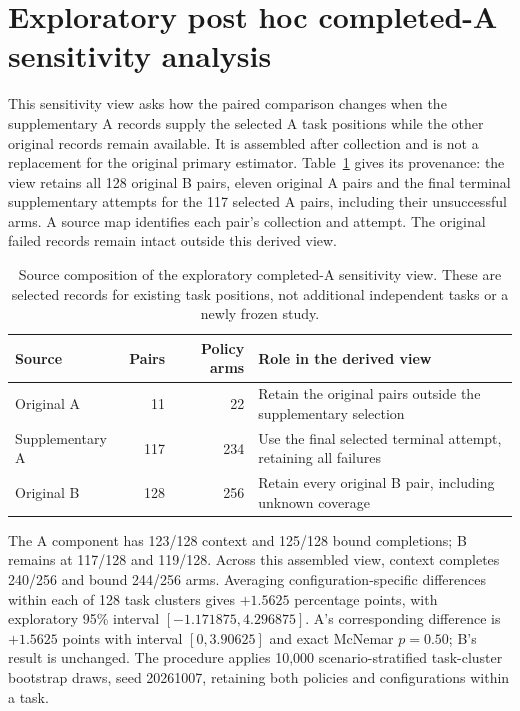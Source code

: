 \documentclass[11pt,a4paper]{article}
\begin{document}
\section{Exploratory post hoc completed-A sensitivity analysis}
\label{app:completed-a-sensitivity}
This sensitivity view asks how the paired comparison changes when the supplementary A records supply the selected A task positions while the other original records remain available. It is assembled after collection and is not a replacement for the original primary estimator. Table~\ref{tab:sensitivity-sources} gives its provenance: the view retains all 128 original B pairs, eleven original A pairs and the final terminal supplementary attempts for the 117 selected A pairs, including their unsuccessful arms. A source map identifies each pair's collection and attempt. The original failed records remain intact outside this derived view.

\begin{table}[htbp]
\centering\small
\caption{Source composition of the exploratory completed-A sensitivity view. These are selected records for existing task positions, not additional independent tasks or a newly frozen study.}\label{tab:sensitivity-sources}
\begin{tabularx}{\textwidth}{@{}lrrX@{}}
\toprule
Source & Pairs & Policy arms & Role in the derived view \\
\midrule
Original A & 11 & 22 & Retain the original pairs outside the supplementary selection \\
Supplementary A & 117 & 234 & Use the final selected terminal attempt, retaining all failures \\
Original B & 128 & 256 & Retain every original B pair, including unknown coverage \\
\bottomrule
\end{tabularx}
\end{table}

The A component has 123/128 context and 125/128 bound completions; B remains at 117/128 and 119/128. Across this assembled view, context completes 240/256 and bound 244/256 arms. Averaging configuration-specific differences within each of 128 task clusters gives $+1.5625$ percentage points, with exploratory 95\% interval $[-1.171875,4.296875]$. A's corresponding difference is $+1.5625$ points with interval $[0,3.90625]$ and exact McNemar $p=0.50$; B's result is unchanged. The procedure applies 10,000 scenario-stratified task-cluster bootstrap draws, seed 20261007, retaining both policies and configurations within a task.
\end{document}

